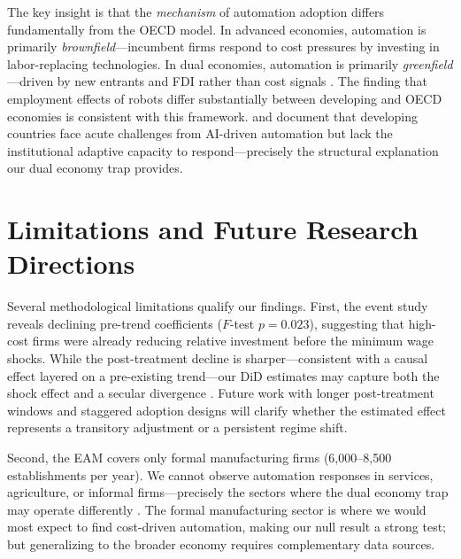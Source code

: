 \documentclass[5p,times,authoryear]{elsarticle}
\begin{document}
The key insight is that the \emph{mechanism} of automation adoption differs fundamentally from the OECD model. In advanced economies, automation is primarily \emph{brownfield}---incumbent firms respond to cost pressures by investing in labor-replacing technologies. In dual economies, automation is primarily \emph{greenfield}---driven by new entrants and FDI rather than cost signals \citep{artuc2023robots, hallward2018trouble}. The \citet{carbonero2020robots} finding that employment effects of robots differ substantially between developing and OECD economies is consistent with this framework. \citet{gmyrek2023generative} and \citet{oecd2025voces} document that developing countries face acute challenges from AI-driven automation but lack the institutional adaptive capacity to respond---precisely the structural explanation our dual economy trap provides.

\FloatBarrier


\section{Limitations and Future Research Directions}
\label{sec:limitations}

Several methodological limitations qualify our findings. First, the event study reveals declining pre-trend coefficients ($F$-test $p = 0.023$), suggesting that high-cost firms were already reducing relative investment before the minimum wage shocks. While the post-treatment decline is sharper---consistent with a causal effect layered on a pre-existing trend---our DiD estimates may capture both the shock effect and a secular divergence \citep{autor2018automation}. Future work with longer post-treatment windows and staggered adoption designs \citep{dauth2021} will clarify whether the estimated effect represents a transitory adjustment or a persistent regime shift.

Second, the EAM covers only formal manufacturing firms (6,000--8,500 establishments per year). We cannot observe automation responses in services, agriculture, or informal firms---precisely the sectors where the dual economy trap may operate differently \citep{perry2007informality, loayza2011informal}. The formal manufacturing sector is where we would most expect to find cost-driven automation, making our null result a strong test; but generalizing to the broader economy requires complementary data sources.
\end{document}
